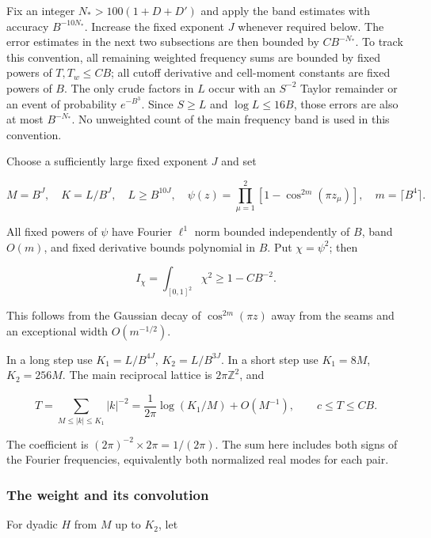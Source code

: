 Fix an integer \(N_*>100(1+D+D')\) and apply the band estimates with accuracy
\(B^{-10N_*}\). Increase the fixed exponent \(J\) whenever required below.
The error estimates in the next two subsections are then bounded by
\(C B^{-N_*}\). To track this convention, all remaining weighted frequency
sums are bounded by fixed powers of \(T,T_w\leq CB\); all cutoff derivative
and cell-moment constants are fixed powers of \(B\). The only crude factors
in \(L\) occur with an \(S^{-2}\) Taylor remainder or an event of probability
\(e^{-B^3}\). Since \(S\geq L\) and \(\log L\leq16B\), those errors are
also at most \(B^{-N_*}\). No unweighted count of the main frequency band
is used in this convention.

Choose a sufficiently large fixed exponent \(J\) and set

\[
M=B^J,\quad K=L/B^J,\quad L\geq B^{10J},
\quad
\psi(z)=\prod_{\mu=1}^2[1-\cos^{2m}(\pi z_\mu)],
\quad m=\lceil B^4\rceil.
\]

All fixed powers of \(\psi\) have Fourier \(\ell^1\) norm bounded independently of \(B\), band \(O(m)\), and fixed derivative bounds polynomial in \(B\). Put \(\chi=\psi^2\); then

\begin{equation}
I_\chi=\int_{[0,1]^2}\chi^2\geq1-CB^{-2}.
\label{eq:pre:6-1}
\end{equation}

This follows from the Gaussian decay of \(\cos^{2m}(\pi z)\) away from the seams and an exceptional width \(O(m^{-1/2})\).

In a long step use \(K_1=L/B^{4J}\), \(K_2=L/B^{3J}\). In a short step use \(K_1=8M\), \(K_2=256M\). The main reciprocal lattice is \(2\pi\mathbb Z^2\), and

\begin{equation}
T=\sum_{M\leq|k|\leq K_1}|k|^{-2}
=\frac1{2\pi}\log(K_1/M)+O(M^{-1}),\qquad c\leq T\leq CB.
\label{eq:pre:6-2}
\end{equation}

The coefficient is \((2\pi)^{-2}\times2\pi=1/(2\pi)\). The sum here includes both signs of the Fourier frequencies, equivalently both normalized real modes for each pair.

\subsubsection{The weight and its convolution}\label{pre:part-6-1}

For dyadic \(H\) from \(M\) up to \(K_2\), let

